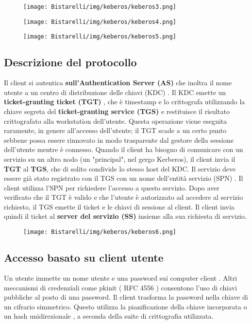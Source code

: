 \begin{figure}[H]
	\centering
    \texttt{[image: Bistarelli/img/keberos/keberos3.png]}
\end{figure}

\begin{figure}[H]
	\centering
    \texttt{[image: Bistarelli/img/keberos/keberos4.png]}
\end{figure}

\begin{figure}[H]
	\centering
    \texttt{[image: Bistarelli/img/keberos/keberos5.png]}
\end{figure}
\subsection{Descrizione del protocollo}
Il client si autentica \textbf{sull'Authentication Server (AS)} che inoltra il nome utente a un centro di distribuzione
delle chiavi (KDC) . Il KDC emette un \textbf{ticket-granting ticket (TGT)} , che è timestamp e lo crittografa utilizzando la chiave segreta del \textbf{ticket-granting service (TGS)} e restituisce il risultato crittografato alla workstation dell'utente. Questa operazione viene eseguita raramente, in genere all'accesso dell'utente; il TGT scade a un certo punto sebbene possa essere rinnovato in modo trasparente dal gestore della sessione dell'utente mentre è
connesso. Quando il client ha bisogno di comunicare con un servizio su un altro nodo (un "principal", nel gergo
Kerberos), il client invia il \textbf{TGT} al \textbf{TGS}, che di solito condivide lo stesso host del KDC. Il servizio deve essere già stato registrato con il TGS con un nome dell'entità servizio (SPN) . Il client utilizza l'SPN per richiedere l'accesso a questo servizio. Dopo aver verificato che il TGT è valido e che l'utente è autorizzato ad accedere al servizio richiesto, il TGS emette il ticket e le chiavi di sessione al client. Il client invia quindi il ticket al \textbf{server del servizio (SS)} insieme alla sua richiesta di servizio.

\begin{figure}[H]
	\centering
    \texttt{[image: Bistarelli/img/keberos/keberos6.png]}
\end{figure}
\subsection{Accesso basato su client utente}
Un utente immette un nome utente e una password sui computer client . Altri meccanismi di credenziali come
pkinit ( RFC 4556 ) consentono l'uso di chiavi pubbliche al posto di una password. Il client trasforma la password
nella chiave di un cifrario simmetrico. Questo utilizza la pianificazione della chiave incorporata o un hash
unidirezionale , a seconda della suite di crittografia utilizzata.
